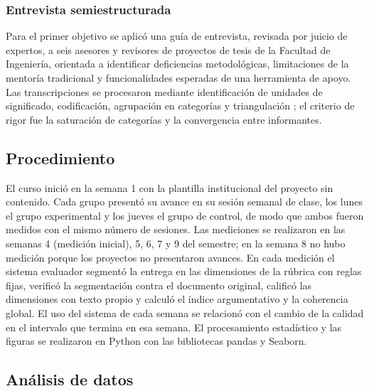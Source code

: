 \documentclass[journal]{IEEEtran}
\begin{document}
\subsubsection{Entrevista semiestructurada}
Para el primer objetivo se aplicó una guía de entrevista, revisada por juicio de expertos, a seis asesores y revisores de proyectos de tesis de la Facultad de Ingeniería, orientada a identificar deficiencias metodológicas, limitaciones de la mentoría tradicional y funcionalidades esperadas de una herramienta de apoyo. Las transcripciones se procesaron mediante identificación de unidades de significado, codificación, agrupación en categorías y triangulación \cite{vives2021}; el criterio de rigor fue la saturación de categorías y la convergencia entre informantes.

\subsection{Procedimiento}

El curso inició en la semana 1 con la plantilla institucional del proyecto sin contenido. Cada grupo presentó su avance en su sesión semanal de clase, los lunes el grupo experimental y los jueves el grupo de control, de modo que ambos fueron medidos con el mismo número de sesiones. Las mediciones se realizaron en las semanas 4 (medición inicial), 5, 6, 7 y 9 del semestre; en la semana 8 no hubo medición porque los proyectos no presentaron avances. En cada medición el sistema evaluador segmentó la entrega en las dimensiones de la rúbrica con reglas fijas, verificó la segmentación contra el documento original, calificó las dimensiones con texto propio y calculó el índice argumentativo y la coherencia global. El uso del sistema de cada semana se relacionó con el cambio de la calidad en el intervalo que termina en esa semana. El procesamiento estadístico y las figuras se realizaron en Python con las bibliotecas pandas y Seaborn.

\subsection{Análisis de datos}
\end{document}
